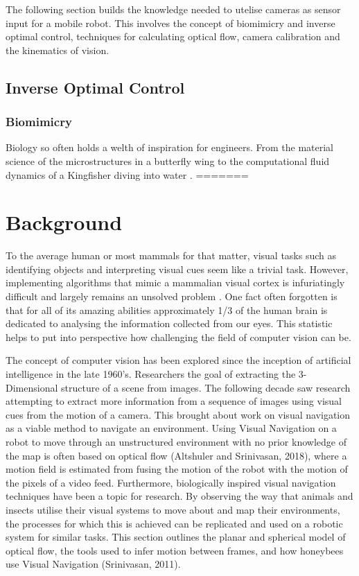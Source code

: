 \documentclass{UoNMCHA}
\numberwithin{equation}{section}
\begin{document}
The following section builds the knowledge needed to utelise cameras as sensor input for a mobile robot. This involves the concept of biomimicry and inverse optimal control, techniques for calculating optical flow, camera calibration and the kinematics of vision.

\subsection{Inverse Optimal Control} %

\subsubsection{Biomimicry} %
Biology so often holds a welth of inspiration for engineers. From the material science of the microstructures in a butterfly wing to the computational fluid dynamics of a Kingfisher diving into water \citep{benyus1997biomimicry}.
=======
\section{Background}\label{sec:Background}
To the average human or most mammals for that matter, visual tasks such as identifying objects and interpreting visual cues seem like a trivial task. However, implementing algorithms that mimic a mammalian visual cortex is infuriatingly difficult and largely remains an unsolved problem \citep{hartley2003multiple}. One fact often forgotten is that for all of its amazing abilities approximately 1/3 of the human brain is dedicated to analysing the information collected from our eyes. This statistic helps to put into perspective how challenging the field of computer vision can be.

The concept of computer vision has been explored since the inception of artificial intelligence in the late 1960’s. Researchers the goal of extracting the 3-Dimensional structure of a scene from images. The following decade saw research attempting to extract more information from a sequence of images using visual cues from the motion of a camera. This brought about work on visual navigation as a viable method to navigate an environment. Using Visual Navigation on a robot to move through an unstructured environment with no prior knowledge of the map is often based on optical flow (Altshuler and Srinivasan, 2018), where a motion field is estimated from fusing the motion of the robot with the motion of the pixels of a video feed. Furthermore, biologically inspired visual navigation techniques have been a topic for research. By observing the way that animals and insects utilise their visual systems to move about and map their environments, the processes for which this is achieved can be replicated and used on a robotic system for similar tasks. This section outlines the planar and spherical model of optical flow, the tools used to infer motion between frames, and how honeybees use Visual Navigation (Srinivasan, 2011).
\end{document}
